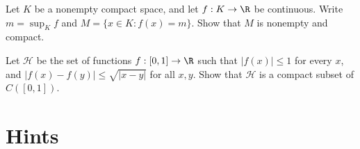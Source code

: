 \begin{exercise}[$\star\star$]\label{ex:v7c04c}
Let $K$ be a nonempty compact space, and let $f:K\to\R$ be continuous. Write $m=\sup_K f$ and $M=\{x\in K:f(x)=m\}$. Show that $M$ is nonempty and compact.
\end{exercise}

\begin{exercise}[$\star\star\star$]\label{ex:v7c04d}
Let $\mathcal H$ be the set of functions $f:[0,1]\to\R$ such that $|f(x)|\le 1$ for every $x$, and $|f(x)-f(y)|\le\sqrt{|x-y|}$ for all $x,y$. Show that $\mathcal H$ is a compact subset of $C([0,1])$.
\end{exercise}

\section{Hints}

